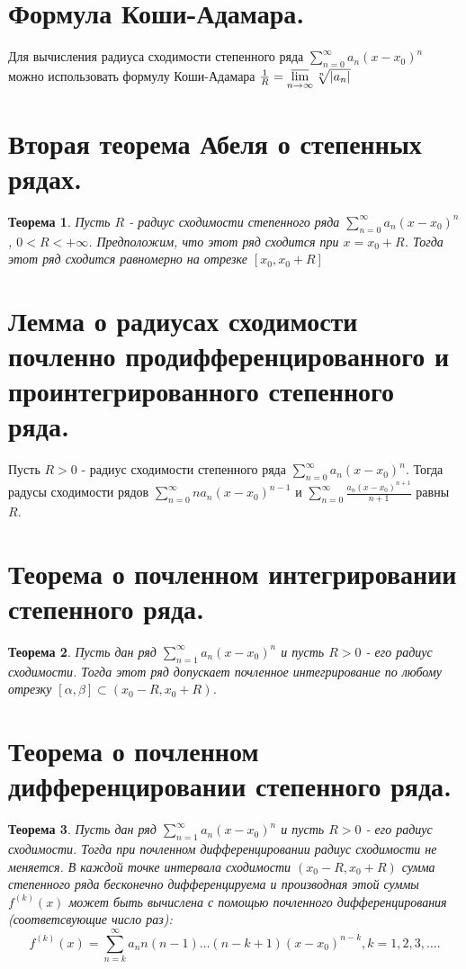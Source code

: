 \documentclass[12pt, a4paper]{article}
\newtheorem{thm}{Теорема}
\begin{document}
\section{Формула Коши-Адамара.}
Для вычисления радиуса сходимости степенного ряда $\sum\limits_{n=0}^{\infty}a_n(x-x_0)^n$ можно использовать формулу Коши-Адамара $\frac{1}{R} = \varlimsup\limits_{n \to \infty}\sqrt[n]{|a_n|}$


\section{Вторая теорема Абеля о степенных рядах.}
\begin{thm}
	Пусть $R$ - радиус сходимости степенного ряда $\sum\limits_{n=0}^{\infty}a_n(x-x_0)^n$,  $0 < R < +\infty$. Предположим, что этот ряд сходится при $x = x_0 + R$. Тогда этот ряд сходится равномерно на отрезке $[x_0, x_0 + R]$
\end{thm}

\section{Лемма о радиусах сходимости почленно продифференцированного и проинтегрированного степенного ряда.}
Пусть $R > 0$ - радиус сходимости степенного ряда $\sum\limits_{n=0}^{\infty}a_n(x-x_0)^n$. Тогда радусы сходимости рядов $\sum\limits_{n=0}^{\infty}na_n(x-x_0)^{n-1}$ и $\sum\limits_{n=0}^{\infty}\frac{a_{n}(x-x_0)^{n+1}}{n+1}$ равны $R$. 


	
\section{Теорема о почленном интегрировании степенного ряда.}
\begin{thm}
	Пусть дан ряд  $\sum\limits_{n=1}^{\infty} a_n \left( x - x_0 \right)^n $ и пусть $R > 0$ - его радиус сходимости. Тогда этот ряд допускает почленное интегрирование по любому отрезку  $[\alpha, \beta] \subset \left( x_0 - R, x_0 + R \right) $.	
\end{thm}


\section{Теорема о почленном дифференцировании степенного ряда.}
\begin{thm}
	Пусть дан ряд  $\sum\limits_{n=1}^{\infty} a_n \left( x - x_0 \right)^n $ и пусть $R > 0$ - его радиус сходимости. Тогда при почленном дифференцировании радиус сходимости не меняется. В каждой точке интервала сходимости $(x_0 - R, x_0 + R)$ сумма степенного ряда бесконечно дифференцируема и производная этой суммы $f^{(k)}(x)$ может быть вычислена с помощью почленного дифференцирования (соответсвующие число раз):
	\[
		f^{\left(k\right) }\left(x\right) = \sum\limits_{n=k}^{\infty} a_n n(n-1)\ldots\left(n - k +1\right)(x - x_0)^{n - k}, k =1, 2, 3, \ldots  
	.\]
\end{thm}
\end{document}
